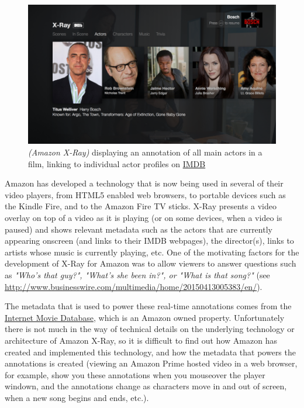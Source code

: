 \begin{figure}[ht]
	\includegraphics[width=\textwidth]{gfx/amazon-x-ray/xray-actors-930x523.png}
	\caption{\textit{(Amazon X-Ray)} displaying an annotation of all main actors in a film, linking to individual actor profiles on \href{http://www.imdb.com}{IMDB}} 
	\label{fig:amazon-x-ray:actors-listing}
\end{figure}

Amazon has developed a technology that is now being used in several of their video players, from HTML5 enabled web browsers, to portable devices such as the Kindle Fire, and to the Amazon Fire TV sticks. X-Ray presents a video overlay on top of a video as it is playing (or on some devices, when a video is paused) and shows relevant metadata such as the actors that are currently appearing onscreen (and links to their IMDB webpages), the director(s), links to artists whose music is currently playing, etc.  One of the motivating factors for the development of X-Ray for Amazon was to allow viewers to answer questions such as \textit{"Who's that guy?", "What's she been in?", or "What is that song?"} (see \url{http://www.businesswire.com/multimedia/home/20150413005383/en/}). 

The metadata that is used to power these real-time annotations comes from the \href{http://www.imdb.com/x-ray/}{Internet Movie Database}, which is an Amazon owned property.  Unfortunately there is not much in the way of technical details on the underlying technology or architecture of Amazon X-Ray, so it is difficult to find out how Amazon has created and implemented this technology, and how the metadata that powers the annotations is created (viewing an Amazon Prime hosted video in a web browser, for example, show you these annotations when you mouseover the player windown, and the annotations change as characters move in and out of screen, when a new song begins and ends, etc.).

